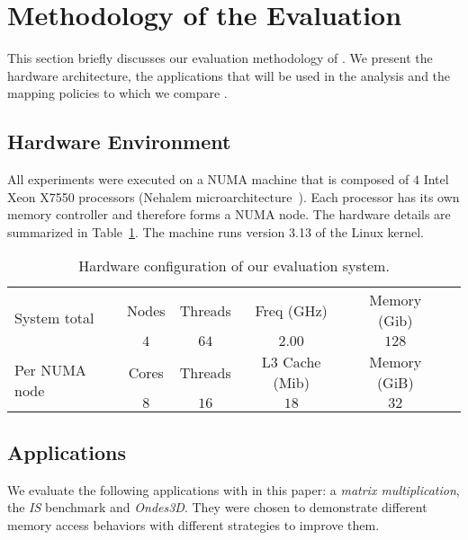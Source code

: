 
\section{Methodology of the Evaluation}
\label{sec:metho}

This section briefly discusses our evaluation methodology of \TABARNAC.
We present the hardware architecture, the applications that will be used in the analysis and the mapping policies to which we compare \TABARNAC.

\subsection{Hardware Environment}
\label{sec:expe-setup}


All experiments were executed on a NUMA machine that is composed of $4$ Intel Xeon X7550
processors (Nehalem microarchitecture~\cite{Intel2010}). Each processor has its own memory controller and therefore forms a NUMA node. The hardware details are summarized in Table~\ref{tab:turing}.
The machine runs version 3.13 of the Linux kernel.

\begin{table}[!h]
    \centering
    \caption{Hardware configuration of our evaluation system.}
    \label{tab:turing}
    \footnotesize
        \begin{tabular}{lccccc}
            \toprule
            \multirow{2}{1.5cm}{System total} & Nodes & Threads & Freq (GHz) & Memory (Gib) \\
            \cmidrule(lr){2-5}
                & $4$   & $64$ & $2.00$ & $128$ \\
            \midrule
           \multirow{2}{1.5cm}{\vspace{2mm}Per NUMA node} & Cores & Threads & L3 Cache (Mib) & Memory (GiB) \\
           \cmidrule(lr){2-5}
            & $8$ & $16$ & $18$ & $32$  \\
            \bottomrule
        \end{tabular}
\end{table}

\subsection{Applications}

We evaluate the following applications with \TABARNAC in this paper: a \emph{matrix multiplication}, the \emph{IS} benchmark and \emph{Ondes3D}.
They were chosen to demonstrate different memory access behaviors with different strategies to improve them.

